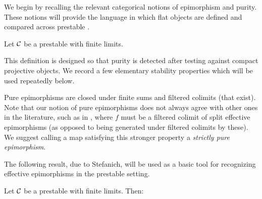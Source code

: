 \documentclass[a4paper,10pt, oneside]{amsart}
\begin{document}
We begin by recalling the relevant categorical notions of epimorphism and purity. These notions will provide the language in which flat objects are defined and compared across prestable \infcats.
	\begin{de}
		Let $\mathcal{C}$ be a prestable \infcat with finite limits.
	\end{de}
	This definition is designed so that purity is detected after testing against compact projective objects. We record a few elementary stability properties which will be used repeatedly below.
	\begin{rem}
		Pure epimorphisms are closed under finite sums and filtered colimits (that exist).
		Note that our notion of pure epimorphisms does not always agree with other ones in the literature, 
		such as in \cite[Definition 3.1]{martini2025locally}, where $f$ must be a filtered colimit of split effective epimorphisms (as opposed to being generated under filtered colimits by these).
		We suggest calling a map satisfying this stronger property a \textit{strictly pure epimorphism}.
	\end{rem}
	The following result, due to Stefanich, will be used as a basic tool for recognizing effective epimorphisms in the prestable setting.
	\begin{prop}
		Let $\mathcal{C}$ be a prestable \infcat with finite limits. Then:
	\end{prop}
\end{document}
